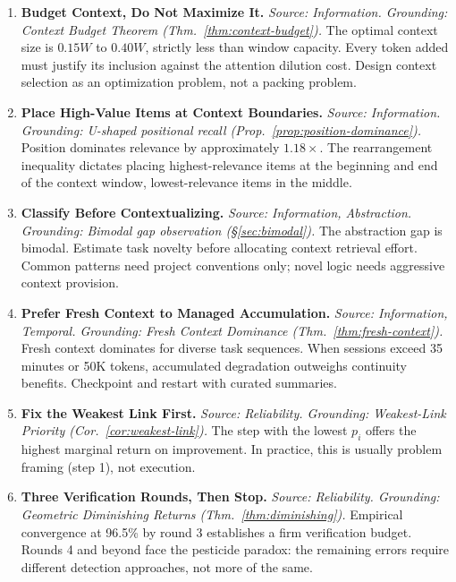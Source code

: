 \begin{enumerate}[label=\textbf{P\arabic*.}, leftmargin=3em]

\item \textbf{Budget Context, Do Not Maximize It.}
\emph{Source: Information. Grounding: Context Budget Theorem (Thm.~\ref{thm:context-budget}).}
The optimal context size is $0.15W$ to $0.40W$, strictly less than window capacity. Every token added must justify its inclusion against the attention dilution cost. Design context selection as an optimization problem, not a packing problem.

\item \textbf{Place High-Value Items at Context Boundaries.}
\emph{Source: Information. Grounding: U-shaped positional recall (Prop.~\ref{prop:position-dominance}).}
Position dominates relevance by approximately $1.18\times$. The rearrangement inequality dictates placing highest-relevance items at the beginning and end of the context window, lowest-relevance items in the middle.

\item \textbf{Classify Before Contextualizing.}
\emph{Source: Information, Abstraction. Grounding: Bimodal gap observation (\S\ref{sec:bimodal}).}
The abstraction gap is bimodal. Estimate task novelty before allocating context retrieval effort. Common patterns need project conventions only; novel logic needs aggressive context provision.

\item \textbf{Prefer Fresh Context to Managed Accumulation.}
\emph{Source: Information, Temporal. Grounding: Fresh Context Dominance (Thm.~\ref{thm:fresh-context}).}
Fresh context dominates for diverse task sequences. When sessions exceed 35 minutes or 50K tokens, accumulated degradation outweighs continuity benefits. Checkpoint and restart with curated summaries.

\item \textbf{Fix the Weakest Link First.}
\emph{Source: Reliability. Grounding: Weakest-Link Priority (Cor.~\ref{cor:weakest-link}).}
The step with the lowest $p_i$ offers the highest marginal return on improvement. In practice, this is usually problem framing (step 1), not execution.

\item \textbf{Three Verification Rounds, Then Stop.}
\emph{Source: Reliability. Grounding: Geometric Diminishing Returns (Thm.~\ref{thm:diminishing}).}
Empirical convergence at 96.5\% by round 3 establishes a firm verification budget. Rounds 4 and beyond face the pesticide paradox: the remaining errors require different detection approaches, not more of the same.


\end{enumerate}
